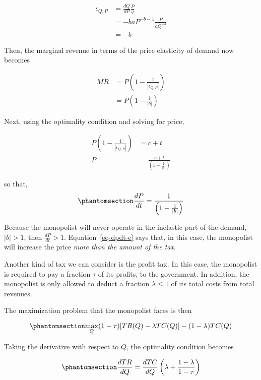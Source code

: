 \documentclass[
]{article}
\begin{document}
\[
\begin{aligned}
\epsilon_{Q,P}&=\frac{dQ}{dP}\frac{P}{q}\\
    &=-baP^{-b-1}\frac{P}{aQ^{-b}}\\
    &=-b
\end{aligned}
\]

Then, the marginal revenue in terms of the price elasticity of demand
now becomes

\[
\begin{aligned}
MR&=P\left(1-\frac{1}{ |\epsilon_{Q,P}| }\right)\\
    &=P\left(1-\frac{1}{ |b| }\right)
\end{aligned}
\]

Next, using the optimality condition and solving for price,

\[
\begin{aligned}
P\left(1-\frac{1}{ |\epsilon_{Q,P}| }\right)&=c+t\\
    P&=\frac{c+t}{\left(1-\frac{1}{ |b| }\right)}
\end{aligned}
\]

so that, \begin{equation}\phantomsection\label{eq-dpdt-e}{
\frac{dP}{dt}=\frac{1}{\left(1-\frac{1}{ |b| }\right)}
}\end{equation}

Because the monopolist will never operate in the inelastic part of the
demand, \(|b| >1\), then \(\frac{dP}{dt}> 1\). Equation~\ref{eq-dpdt-e}
says that, in this case, the monopolist will increase the price
\emph{more than the amount of the tax}.

Another kind of tax we can consider is the profit tax. In this case, the
monopolist is required to pay a fraction \(\tau\) of its profits, to the
government. In addition, the monopolist is only allowed to deduct a
fraction \(\lambda\le1\) of its total costs from total revenues.

The maximization problem that the monopolist faces is then

\begin{equation}\phantomsection\label{eq-profit-tax}{
\max_{Q} (1-\tau)[TR(Q)-\lambda TC(Q)] - (1-\lambda) TC(Q)
}\end{equation}

Taking the derivative with respect to \(Q\), the optimality condition
becomes

\begin{equation}\phantomsection\label{eq-foc-profit-tax}{
\frac{dTR}{dQ} = \frac{dTC}{dQ}\left(\lambda + \frac{1-\lambda}{1-\tau}\right)
}\end{equation}
\end{document}
